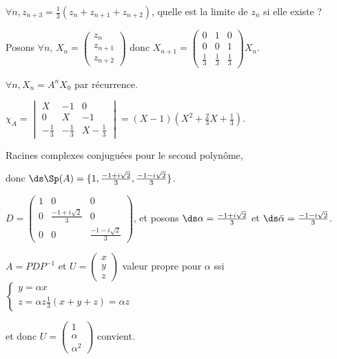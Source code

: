 \begin{exemple}
    $\forall n, z_{n + 3} = \frac 1 3 (z_n + z_{n + 1} + z_{n + 2})$, quelle est la limite 
    de $z_n$ si elle existe ?

    Posons $\forall n, \, X_n = \begin{pmatrix}
        z_n \\
        z_{n + 1} \\
        z_{n + 2}
    \end{pmatrix}$ donc $X_{n + 1} = \begin{pmatrix}
        0 & 1 & 0 \\
        0 & 0 & 1 \\
        \frac{1}{3} & \frac{1}{3} & \frac{1}{3}
    \end{pmatrix} X_n$.


    $\forall n, X_n = A^n X_0$ par récurrence. 

    $\chi_A = \begin{vmatrix}
        X & -1 & 0 \\
        0 & X & -1 \\
        -\frac{1}{3} & -\frac{1}{3} & X - \frac{1}{3}
    \end{vmatrix} = (X - 1)(X^2 + \frac{2}{3} X + \frac{1}{3})$.

    Racines complexes conjuguées pour le second polynôme, 
    
    donc $\ds \Sp(A) = \{1, \frac{-1 + i \sqrt{2}}{3}, \frac{-1 - i \sqrt{2}}{3}\}$.

    $D = \begin{pmatrix}
        1 & 0 & 0 \\
        0 & \frac{-1 + i \sqrt{2}}{3} & 0 \\
        0 & 0 & \frac{-1 - i \sqrt{2}}{3}
    \end{pmatrix}$, et posons $\ds \alpha = \frac{-1 + i \sqrt{2}}{3}$ et $\ds \bar \alpha = \frac{-1 - i \sqrt{2}}{3}$.

    $A = PDP^{-1}$ et $U = \begin{pmatrix}
        x \\
        y \\
        z
    \end{pmatrix}$ valeur propre pour $\alpha$ ssi 
    $\begin{cases}
        y = \alpha x \\
        z = \alpha z 
        \frac 1 3 (x + y + z) = \alpha z
    \end{cases}$ 

    et donc $U = \begin{pmatrix}
        1 \\
        \alpha \\
        \alpha^2
    \end{pmatrix}$ convient. 


\end{exemple}
